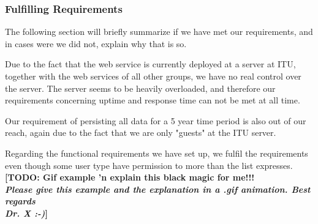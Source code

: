 \subsubsection{Fulfilling Requirements}
The following section will briefly summarize if we have met our requirements, and in cases were we did not, explain why that is so.

Due to the fact that the web service is currently deployed at a server at ITU, together with the web services of all other groups, we have no real control over the server. The server seems to be heavily overloaded, and therefore our requirements concerning uptime and response time can not be met at all time.

Our requirement of persisting all data for a 5 year time period is also out of our reach, again due to the fact that we are only "guests" at the ITU server.

Regarding the functional requirements we have set up, we fulfil the requirements even though some user type have permission to more than the list expresses.
\textbf{[TODO: Gif example 'n explain this black magic for me!!! \\\textit{Please give this example and the explanation in a .gif animation. Best regards\\Dr. X :-)}]}